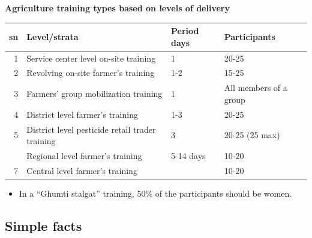 \documentclass[
  openany]{book}
\providecommand{\tightlist}{%
  \setlength{\itemsep}{0pt}\setlength{\parskip}{0pt}}
\begin{document}
\textbf{Agriculture training types based on levels of delivery}

\begin{table}[!h]
\centering\begingroup\fontsize{8}{10}\selectfont

\begin{tabular}{rlll}
\toprule
sn & Level/strata & Period days & Participants\\
\midrule
\rowcolor{gray!6}  1 & Service center level on-site training & 1 & 20-25\\
2 & Revolving on-site farmer's training & 1-2 & 15-25\\
\rowcolor{gray!6}  3 & Farmers' group mobilization training & 1 & All members of a group\\
4 & District level farmer's training & 1-3 & 20-25\\
\rowcolor{gray!6}  5 & District level pesticide retail trader training & 3 & 20-25 (25 max)\\
\addlinespace
6 & Regional level farmer's training & 5-14 days & 10-20\\
\rowcolor{gray!6}  7 & Central level farmer's training &  & 10-20\\
\bottomrule
\end{tabular}
\endgroup{}
\end{table}

\begin{itemize}
\tightlist
\item
  In a ``Ghumti stalgat'' training, 50\% of the participants should be women.
\end{itemize}

\hypertarget{simple-facts}{%
\subsection{Simple facts}\label{simple-facts}}
\end{document}

